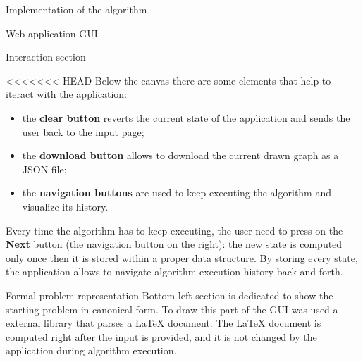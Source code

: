 \documentclass[9pt]{extarticle}
\begin{document}
\begin{section}{Implementation of the algorithm}
\begin{subsection}{Web application GUI}
            \begin{subsubsection}{Interaction section}
                \label{subsec:interaction}

<<<<<<< HEAD
                Below the canvas there are some elements that help to iteract with the application:
                \begin{itemize}
                    \item the \textbf{clear button} reverts the current state of the application and sends the user back to the input page;
                    \item the \textbf{download button} allows to download the current drawn graph as a JSON file;
                    \item the \textbf{navigation buttons} are used to keep executing the algorithm and visualize its history.
                \end{itemize}

                Every time the algorithm has to keep executing, the user need to press on the \textbf{Next} button (the navigation button on the 
                right): the new state is computed only once then it is stored within a proper data structure. 
                By storing every state, the application allows to navigate algorithm execution history back and forth.

            \end{subsubsection}

            \begin{subsubsection}{Formal problem representation}
                Bottom left section is dedicated to show the starting problem in canonical form. 
                To draw this part of the GUI was used a external library that parses a LaTeX document.
                The LaTeX document is computed right after the input is provided, and it is not changed by the application during algorithm execution.
            \end{subsubsection}


\end{subsection}
\end{section}
\end{document}
